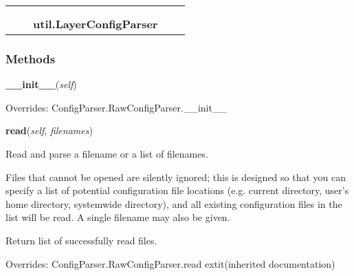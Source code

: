     \label{util:LayerConfigParser}
\begin{tabular}{cccccc}
\multicolumn{2}{r}{\settowidth{\BCL}{ConfigParser.RawConfigParser}\multirow{2}{\BCL}{ConfigParser.RawConfigParser}}
&&
  \\\cline{3-3}
  &&\multicolumn{1}{c|}{}
&&
  \\
&&\multicolumn{2}{l}{\textbf{util.LayerConfigParser}}
\end{tabular}



  \subsubsection{Methods}

    \vspace{0.5ex}

\hspace{.8\funcindent}\begin{boxedminipage}{\funcwidth}

    \raggedright \textbf{\_\_init\_\_}(\textit{self})

\setlength{\parskip}{2ex}
\setlength{\parskip}{1ex}
      Overrides: ConfigParser.RawConfigParser.\_\_init\_\_

    \end{boxedminipage}

    \vspace{0.5ex}

\hspace{.8\funcindent}\begin{boxedminipage}{\funcwidth}

    \raggedright \textbf{read}(\textit{self}, \textit{filenames})

\setlength{\parskip}{2ex}
    Read and parse a filename or a list of filenames.

    Files that cannot be opened are silently ignored; this is designed so 
    that you can specify a list of potential configuration file locations 
    (e.g. current directory, user's home directory, systemwide directory), 
    and all existing configuration files in the list will be read.  A 
    single filename may also be given.

    Return list of successfully read files.

\setlength{\parskip}{1ex}
      Overrides: ConfigParser.RawConfigParser.read 	extit{(inherited documentation)}

    \end{boxedminipage}

